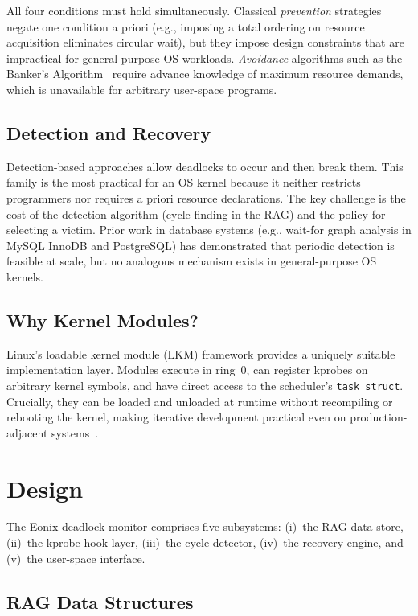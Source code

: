 \documentclass[11pt,letterpaper]{article}
\begin{document}
All four conditions must hold simultaneously.  Classical
\emph{prevention} strategies negate one condition a priori (e.g.,
imposing a total ordering on resource acquisition eliminates circular
wait), but they impose design constraints that are impractical for
general-purpose OS workloads.  \emph{Avoidance} algorithms such as the
Banker's Algorithm~\cite{dijkstra1968} require advance knowledge of
maximum resource demands, which is unavailable for arbitrary user-space
programs.

\subsection{Detection and Recovery}

Detection-based approaches allow deadlocks to occur and then break them.
This family is the most practical for an OS kernel because it neither
restricts programmers nor requires a priori resource declarations.  The
key challenge is the cost of the detection algorithm (cycle finding in
the RAG) and the policy for selecting a victim.  Prior work in database
systems (e.g., wait-for graph analysis in MySQL InnoDB and PostgreSQL)
has demonstrated that periodic detection is feasible at scale, but no
analogous mechanism exists in general-purpose OS kernels.

\subsection{Why Kernel Modules?}

Linux's loadable kernel module (LKM) framework provides a uniquely
suitable implementation layer.  Modules execute in ring~0, can register
kprobes on arbitrary kernel symbols, and have direct access to the
scheduler's \texttt{task\_struct}.  Crucially, they can be loaded and
unloaded at runtime without recompiling or rebooting the kernel, making
iterative development practical even on production-adjacent
systems~\cite{kprobes}.

\section{Design}

The Eonix deadlock monitor comprises five subsystems: (i)~the RAG data
store, (ii)~the kprobe hook layer, (iii)~the cycle detector, (iv)~the
recovery engine, and (v)~the user-space interface.

\subsection{RAG Data Structures}
\end{document}

